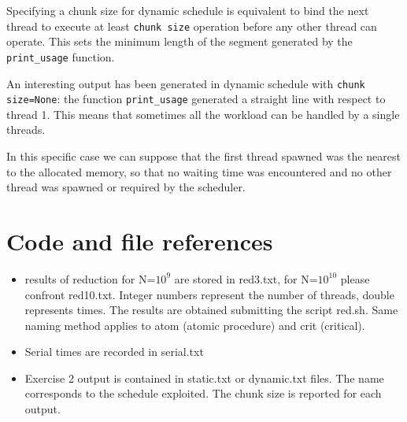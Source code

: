 \documentclass[10pt,a4paper]{article}
\begin{document}
Specifying a chunk size for dynamic schedule is equivalent to bind the next thread to execute at least \texttt{chunk size} operation before any other thread can operate. This sets the minimum length of the segment generated by the \texttt{print\_usage} function.

An interesting output has been generated in dynamic schedule with \texttt{chunk size=None}: the function \texttt{print\_usage} generated a straight line with respect to thread 1. This means that sometimes all the workload can be handled by a single threads.

In this specific case we can suppose that the first thread spawned was the nearest to the allocated memory, so that no waiting time was encountered and no other thread was spawned or required by the scheduler.

\section*{Code and file references}

\begin{itemize}
	\item results of reduction for N=$10^9$ are stored in red3.txt, for N=$10^{10}$ please confront red10.txt. Integer numbers represent the number of threads, double represents times. The results are obtained submitting the script red.sh. Same naming method applies to atom (atomic procedure) and crit (critical).
	\item Serial times are recorded in serial.txt
	\item Exercise 2 output is contained in static.txt or dynamic.txt files. The name corresponds to the schedule exploited. The chunk size is reported for each output.
	\end{itemize}		
\end{document}
